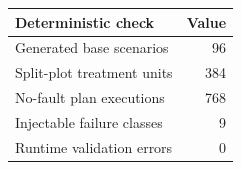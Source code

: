\begin{tabular}{lr}
\toprule
Deterministic check & Value \\
\midrule
Generated base scenarios & 96 \\
Split-plot treatment units & 384 \\
No-fault plan executions & 768 \\
Injectable failure classes & 9 \\
Runtime validation errors & 0 \\
\bottomrule
\end{tabular}
